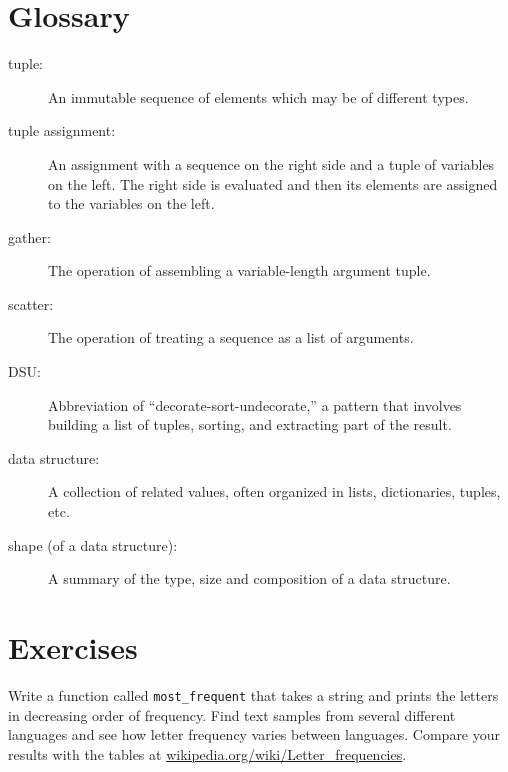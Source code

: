 \documentclass[10pt]{book}
\begin{document}
{%

\section{Glossary}

\begin{description}

\item[tuple:] An immutable sequence of elements which may be of different types.

\item[tuple assignment:] An assignment with a sequence on the
right side and a tuple of variables on the left.  The right
side is evaluated and then its elements are assigned to the
variables on the left.

\item[gather:] The operation of assembling a variable-length
argument tuple.

\item[scatter:] The operation of treating a sequence as a list of
arguments.

\item[DSU:] Abbreviation of ``decorate-sort-undecorate,'' a
pattern that involves building a list of tuples, sorting, and
extracting part of the result.

\item[data structure:] A collection of related values, often
organized in lists, dictionaries, tuples, etc.

\item[shape (of a data structure):] A summary of the type,
size and composition of a data structure.

\end{description}


\section{Exercises}
\begin{ex}
Write a function called \verb"most_frequent" that takes a string and
prints the letters in decreasing order of frequency.  Find text
samples from several different languages and see how letter frequency
varies between languages.  Compare your results with the tables at
\url{wikipedia.org/wiki/Letter_frequencies}.



\end{ex}}
\end{document}

